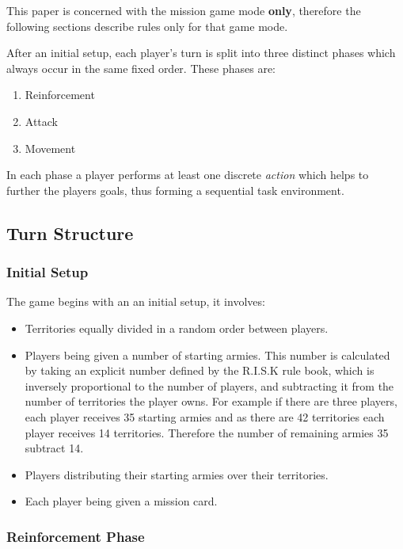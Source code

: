 \documentclass[parskip]{cs4rep}
\begin{document}
This paper is concerned with the mission game mode \textbf{only}, therefore the following sections describe rules only for that game mode.

After an initial setup, each player's turn is split into three distinct phases which always occur in the same fixed order. These phases are:

\begin{enumerate}
\item
Reinforcement
\item
Attack
\item
Movement
\end{enumerate}

In each phase a player performs at least one discrete \textit{action} which helps to further the players goals, thus forming a sequential task environment.

\subsection{Turn Structure}

\subsubsection{Initial Setup}

The game begins with an an initial setup, it involves:

\begin{itemize}
\item
Territories equally divided in a random order between players.
\item
Players being given a number of starting armies. This number is calculated by taking an explicit number defined by the R.I.S.K rule book, which is inversely proportional to the number of players, and subtracting it from the number of territories the player owns. For example if there are three players, each player receives 35 starting armies and as there are 42 territories each player receives 14 territories. Therefore the number of remaining armies 35 subtract 14.
\item
Players distributing their starting armies over their territories.
\item
Each player being given a mission card.
\end{itemize}

\subsubsection{Reinforcement Phase}
\end{document}
